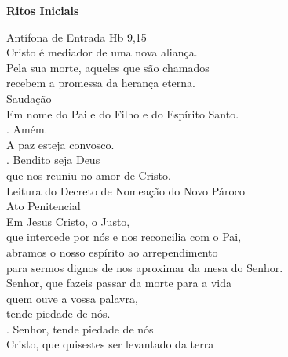 \documentclass{book}
\begin{document}


\cleardoublepage{}
\begin{center}
    \textbf{Ritos Iniciais}
\end{center}
\begin{flushleft}
    \textcolor{VioletRed2}{Antífona de Entrada}
    \hspace{\fill}
    \textcolor{VioletRed2}{Hb 9,15}
    \vspace{.2cm} \\
    Cristo é mediador de uma nova aliança. \\
    Pela sua morte, aqueles que são chamados \\
    recebem a promessa da herança eterna.
    \vspace{.2cm} \\
    \textcolor{VioletRed2}{Saudação}
    \vspace{.2cm}\\
    Em nome do Pai e do Filho e do Espírito Santo. \\
    {\color{VioletRed2} \Rbar.} Amém. \\
    A paz esteja convosco. \\
    {\color{VioletRed2} \Rbar.} Bendito seja Deus \\
    que nos reuniu no amor de Cristo.
    \vspace{.2cm} \\
    \textcolor{VioletRed2}{Leitura do Decreto de Nomeação do Novo Pároco}
    \vspace{.2cm} \\
    \textcolor{VioletRed2}{Ato Penitencial}
    \vspace{.2cm} \\
    Em Jesus Cristo, o Justo, \\
    que intercede por nós e nos reconcilia com o Pai, \\
    abramos o nosso espírito ao arrependimento \\
    para sermos dignos de nos aproximar da mesa do Senhor.
    \vspace{.2cm} \\
    Senhor, que fazeis passar da morte para a vida \\
    quem ouve a vossa palavra, \\
    tende piedade de nós. \\
    {\color{VioletRed2} \Rbar.} Senhor, tende piedade de nós
    \vspace{.2cm} \\
    Cristo, que quisestes ser levantado da terra \\

\end{flushleft}
\end{document}
